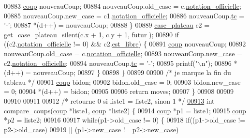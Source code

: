\begin{DoxyCode}
00883                         \hyperlink{structcoup}{coup} nouveauCoup;
00884                         nouveauCoup.old\_case = c.\hyperlink{structcase__plateau_ad510581b324604a9cf685cbb769a421a}{notation_officielle};
00885                         nouveauCoup.new\_case = c1.\hyperlink{structcase__plateau_ad510581b324604a9cf685cbb769a421a}{notation_officielle};
00886                         nouveauCoup.\hyperlink{structcoup_aa33da004dccb192cb33bc00c26c6e859}{tc} = \textcolor{charliteral}{'-'};
00887                         *(d++) = nouveauCoup;
00888                 \}
00889                 \hyperlink{structcase__plateau}{case_plateau} c2 = \hyperlink{plateau_8h_a60a8f706865d0ae9087f8d65d4667655}{get_case_plateau_silent}(c.x + 1, c.y + 1, futur
      );
00890                 \textcolor{keywordflow}{if} ((c2.\hyperlink{structcase__plateau_ad510581b324604a9cf685cbb769a421a}{notation_officielle} != 0) && c2.\hyperlink{structcase__plateau_a173f25d2fd7c653d77ca8174ba4f636d}{est_libre}) \{
00891                         \hyperlink{structcoup}{coup} nouveauCoup;
00892                         nouveauCoup.old\_case = c.\hyperlink{structcase__plateau_ad510581b324604a9cf685cbb769a421a}{notation_officielle};
00893                         nouveauCoup.new\_case = c2.\hyperlink{structcase__plateau_ad510581b324604a9cf685cbb769a421a}{notation_officielle};
00894                         nouveauCoup.\hyperlink{structcoup_aa33da004dccb192cb33bc00c26c6e859}{tc} = \textcolor{charliteral}{'-'};
00895                         printf(\textcolor{stringliteral}{"\(\backslash\)n"});
00896                         *(d++) = nouveauCoup;
00897                 \}
00898         \}
00899 
00900         \textcolor{comment}{/* je marque la fin du tableau */}
00901         \hyperlink{structcoup}{coup} bidon;
00902         bidon.old\_case = 0;
00903         bidon.new\_case = 0;
00904         *(d++) = bidon;
00905 
00906         \textcolor{keywordflow}{return} moves;
00907 \}
00908 
00909 
00910 
00911 
00912 \textcolor{comment}{/* retourne 0 si liste1 = liste2, sinon 1 */}
\hypertarget{regles_8c_source_l00913}{}\hyperlink{regles_8h_aec569c705e9ec403a06151aba2092c52}{00913} \textcolor{keywordtype}{int} compare\_coups(\hyperlink{structcoup}{coup} *liste1, \hyperlink{structcoup}{coup} *liste2) \{
00914         \hyperlink{structcoup}{coup} *p1 = liste1;
00915         \hyperlink{structcoup}{coup} *p2 = liste2;
00916 
00917         \textcolor{keywordflow}{while}(p1->old\_case != 0) \{
00918                 \textcolor{keywordflow}{if}((p1->old\_case != p2->old\_case)
00919                                 || (p1->new\_case != p2->new\_case)

\end{DoxyCode}
